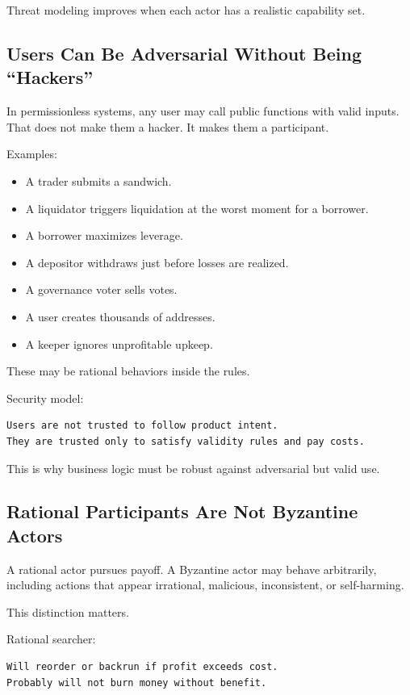 Threat modeling improves when each actor has a realistic capability set.

\subsection{Users Can Be Adversarial Without Being ``Hackers''}

In permissionless systems, any user may call public functions with valid
inputs. That does not make them a hacker. It makes them a participant.

Examples:

\begin{itemize}
\tightlist
\item
  A trader submits a sandwich.
\item
  A liquidator triggers liquidation at the worst moment for a borrower.
\item
  A borrower maximizes leverage.
\item
  A depositor withdraws just before losses are realized.
\item
  A governance voter sells votes.
\item
  A user creates thousands of addresses.
\item
  A keeper ignores unprofitable upkeep.
\end{itemize}

These may be rational behaviors inside the rules.

Security model:

\begin{lstlisting}
Users are not trusted to follow product intent.
They are trusted only to satisfy validity rules and pay costs.
\end{lstlisting}

This is why business logic must be robust against adversarial but valid
use.

\subsection{Rational Participants Are Not Byzantine Actors}

A rational actor pursues payoff. A Byzantine actor may behave
arbitrarily, including actions that appear irrational, malicious,
inconsistent, or self-harming.

This distinction matters.

Rational searcher:

\begin{lstlisting}
Will reorder or backrun if profit exceeds cost.
Probably will not burn money without benefit.
\end{lstlisting}

